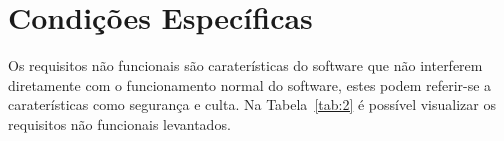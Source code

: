 \section{Condições Específicas}

Os requisitos não funcionais são caraterísticas do software que não interferem diretamente com o 
funcionamento normal do software, estes podem referir-se a caraterísticas como segurança e culta. 
Na Tabela~\ref{tab:2} é possível visualizar os requisitos não funcionais levantados.


